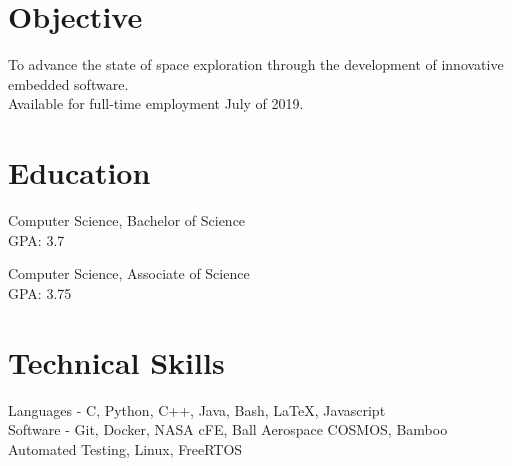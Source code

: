 \documentclass[10pt,final,sans]{resume}
\begin{document}
\setlength\headheight{36pt} %

\section{Objective}
To advance the state of space exploration through the development of innovative embedded software.\\
Available for full-time employment July of 2019.
\section{Education}
Computer Science, Bachelor of Science \\
GPA: 3.7

Computer Science, Associate of Science \\
GPA: 3.75
\section{Technical Skills}
Languages - C, Python, C++, Java, Bash, \LaTeX{}, Javascript \\
Software - Git, Docker, NASA cFE, Ball Aerospace COSMOS, Bamboo Automated Testing, Linux, FreeRTOS
\end{document}
